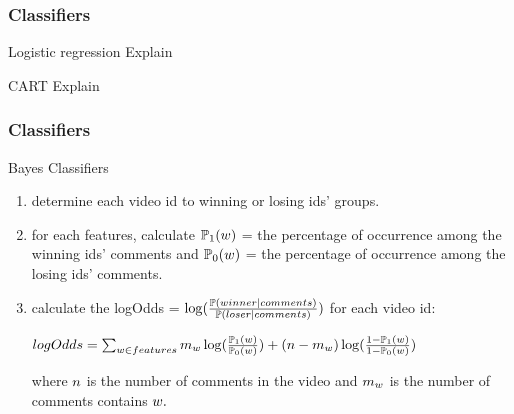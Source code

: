 \documentclass[fleqn]{beamer}
\begin{document}
\begin{frame}
\frametitle{Classifiers}

     \begin{beamerboxesrounded}{Logistic regression}
         Explain
     \end{beamerboxesrounded}
     
     \begin{beamerboxesrounded}{CART}
         Explain
      \end{beamerboxesrounded}

\end{frame}
\begin{frame}
\frametitle{Classifiers}	
 

      \begin{beamerboxesrounded}{Bayes Classifiers}     
      \begin{enumerate}\vspace{2mm}
      \item determine each video id to winning or losing ids' groups.\vspace{3mm}
      \item for each features, calculate $\mathbb{P}_1(\mathnormal{w})$ = the percentage of occurrence among the winning ids' comments and $\mathbb{P}_0(\mathnormal{w})$ = the percentage of occurrence among the losing ids' comments.\vspace{2mm}
      \item calculate the logOdds = $\mathnormal{\log}(\frac{\mathbb{P}(winner | comments)}{\mathbb{P}(loser | comments)}) $ for each video id: \vspace{3mm}
      
$logOdds=\sum_{\mathnormal{w}  \in features} \mathnormal{m_w}\log(\frac{\mathbb{P}_1(\mathnormal{w})}{\mathbb{P}_0(\mathnormal{w})}) + (\mathnormal{n-m_w})\log(\frac{1-\mathbb{P}_1(\mathnormal{w})}{1-\mathbb{P}_0(\mathnormal{w})})$\vspace{3mm}

where $\mathnormal{n}$ is the number of comments in the video and $\mathnormal{m_w}$ is the number of comments contains $\mathnormal{w}.$  \vspace{3mm}
      \end{enumerate}
    \end{beamerboxesrounded}

\end{frame}
\end{document}
